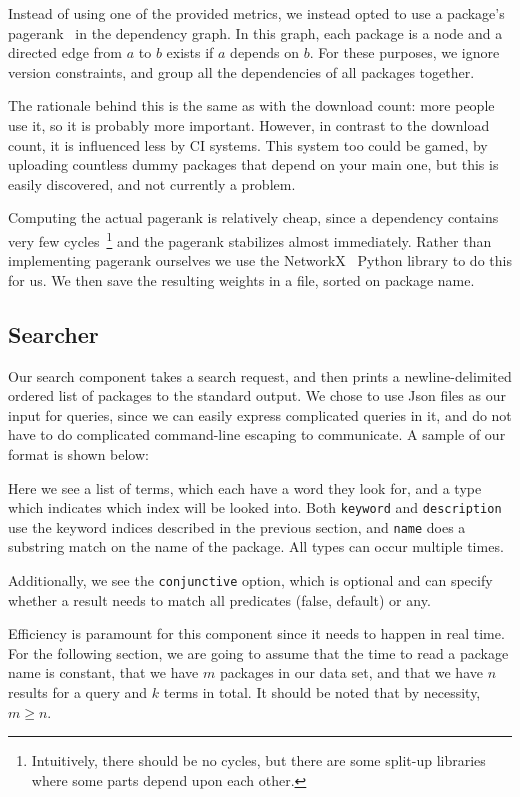 \documentclass{article}
\begin{document}
Instead of using one of the provided metrics, we instead opted to use a package's pagerank~\cite{pagerank}
in the dependency graph. In this graph, each package is a node and a directed edge from $a$ to $b$ exists if $a$ depends on $b$. For these purposes, we ignore version constraints, and group all the dependencies of all packages together.

The rationale behind this is the same as with the download count: more people use it, so it is probably more important. However, in contrast to the download count, it is influenced less by CI systems. This system too could be gamed, by uploading countless dummy packages that depend on your main one, but this is easily discovered, and not currently a problem.

Computing the actual pagerank is relatively cheap, since a dependency contains very few cycles~\footnote{Intuitively, there should be no cycles, but there are some split-up libraries where some parts depend upon each other.} and the pagerank stabilizes almost immediately. Rather than implementing pagerank ourselves we use the NetworkX~\cite{networkx} Python library to do this for us. We then save the resulting weights in a file, sorted on package name.


\subsection{Searcher}

Our search component takes a search request, and then prints a newline-delimited ordered list of packages to the standard output. We chose to use Json files as our input for queries, since we can easily express complicated queries in it, and do not have to do complicated command-line escaping to communicate. A sample of our format is shown below:



Here we see a list of terms, which each have a word they look for, and a type which indicates which index will be looked into. Both \texttt{keyword} and \texttt{description} use the keyword indices described in the previous section, and \texttt{name} does a substring match on the name of the package. All types can occur multiple times.

Additionally, we see the \texttt{conjunctive} option, which is optional and can specify whether a result needs to match all predicates (false, default) or any.

Efficiency is paramount for this component since it needs to happen in real time. For the following section, we are going to assume that the time to read a package name is constant, that we have $m$ packages in our data set, and that we have $n$ results for a query and $k$ terms in total. It should be noted that by necessity, $m \geq n$.
\end{document}
